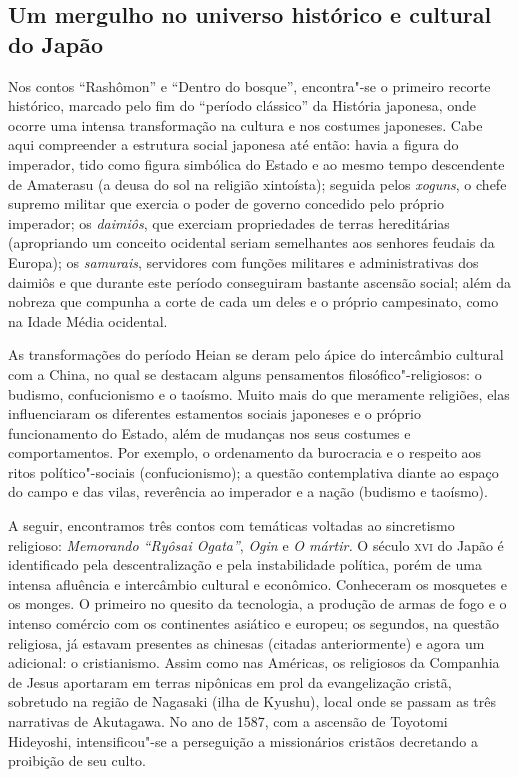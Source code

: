 \documentclass[12pt]{extarticle}
\begin{document}


\subsection{Um mergulho no universo histórico e cultural do Japão}

Nos contos ``Rashômon'' e ``Dentro do bosque'', encontra"-se o primeiro
recorte histórico, marcado pelo fim do ``período clássico'' da História
japonesa, onde ocorre uma intensa transformação na cultura e nos costumes
japoneses. Cabe aqui compreender a estrutura social japonesa até então: havia a
figura do imperador, tido como figura simbólica do Estado e ao mesmo tempo
descendente de Amaterasu (a deusa do sol na religião xintoísta); seguida pelos
\emph{xoguns}, o chefe supremo militar que exercia o poder de governo concedido
pelo próprio imperador; os \emph{daimiôs}, que exerciam propriedades de terras
hereditárias (apropriando um conceito ocidental seriam semelhantes aos senhores
feudais da Europa); os \emph{samurais}, servidores com funções militares e
administrativas dos daimiôs e que durante este período conseguiram bastante
ascensão social; além da nobreza que compunha a corte de cada um deles e o
próprio campesinato, como na Idade Média ocidental.

As transformações do período Heian se deram pelo ápice do intercâmbio cultural
com a China, no qual se destacam alguns pensamentos filosófico"-religiosos: o
budismo, confucionismo e o taoísmo. Muito mais do que meramente religiões, elas
influenciaram os diferentes estamentos sociais japoneses e o próprio
funcionamento do Estado, além de mudanças nos seus costumes e comportamentos.
Por exemplo, o ordenamento da burocracia e o respeito aos ritos
político"-sociais (confucionismo); a questão contemplativa diante ao espaço do
campo e das vilas, reverência ao imperador e a nação (budismo e taoísmo).

A seguir, encontramos três contos com temáticas voltadas ao sincretismo
religioso: \emph{Memorando ``Ryôsai Ogata''}, \emph{Ogin} e \emph{O mártir.} O
século \textsc{xvi} do Japão é identificado pela descentralização e pela
instabilidade política, porém de uma intensa afluência e intercâmbio cultural e
econômico. Conheceram os mosquetes e os monges. O primeiro no quesito da
tecnologia, a produção de armas de fogo e o intenso comércio com os continentes
asiático e europeu; os segundos, na questão religiosa, já estavam presentes as
chinesas (citadas anteriormente) e agora um adicional: o cristianismo. Assim
como nas Américas, os religiosos da Companhia de Jesus aportaram em terras
nipônicas em prol da evangelização cristã, sobretudo na região de Nagasaki
(ilha de Kyushu), local onde se passam as três narrativas de Akutagawa. No ano
de 1587, com a ascensão de Toyotomi Hideyoshi, intensificou"-se a perseguição a
missionários cristãos decretando a proibição de seu culto.
\end{document}
